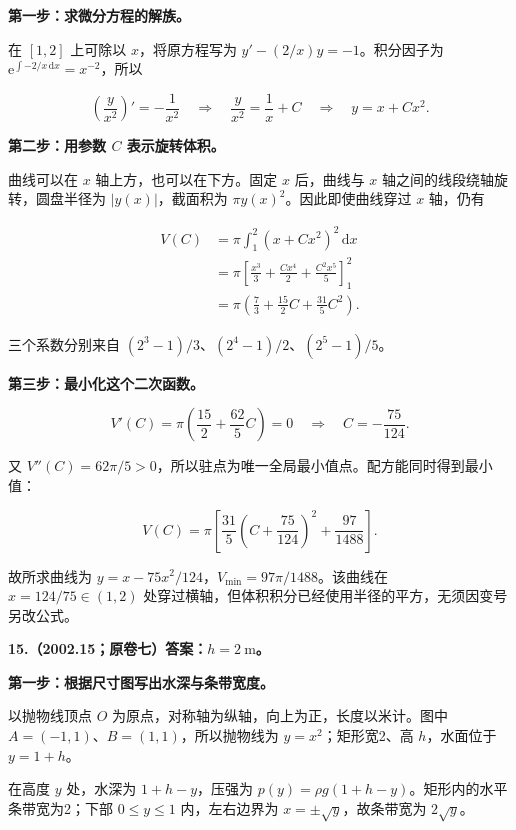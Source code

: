 \documentclass[UTF8,11pt,fontset=windows]{ctexart}
\begin{document}
\textbf{第一步：求微分方程的解族。}

在 $[1,2]$ 上可除以 $x$，将原方程写为 $y'-(2/x)y=-1$。积分因子为 $\mathrm e^{\int-2/x\,\mathrm dx}=x^{-2}$，所以

$$
\left(\frac y{x^2}\right)'=-\frac1{x^2}
\quad\Longrightarrow\quad
\frac y{x^2}=\frac1x+C
\quad\Longrightarrow\quad y=x+Cx^2.
$$

\textbf{第二步：用参数 $C$ 表示旋转体积。}

曲线可以在 $x$ 轴上方，也可以在下方。固定 $x$ 后，曲线与 $x$ 轴之间的线段绕轴旋转，圆盘半径为 $|y(x)|$，截面积为 $\pi y(x)^2$。因此即使曲线穿过 $x$ 轴，仍有

$$
\begin{aligned}
V(C)&=\pi\int_1^2(x+Cx^2)^2\,\mathrm dx\\
&=\pi\left[\frac{x^3}{3}+\frac{Cx^4}{2}+\frac{C^2x^5}{5}\right]_1^2\\
&=\pi\left(\frac73+\frac{15}{2}C+\frac{31}{5}C^2\right).
\end{aligned}
$$

三个系数分别来自 $(2^3-1)/3$、$(2^4-1)/2$、$(2^5-1)/5$。

\textbf{第三步：最小化这个二次函数。}

$$
V'(C)=\pi\left(\frac{15}{2}+\frac{62}{5}C\right)=0
\quad\Longrightarrow\quad C=-\frac{75}{124}.
$$

又 $V''(C)=62\pi/5>0$，所以驻点为唯一全局最小值点。配方能同时得到最小值：

$$
V(C)=\pi\left[\frac{31}{5}\left(C+\frac{75}{124}\right)^2+\frac{97}{1488}\right].
$$

故所求曲线为 $\boxed{y=x-75x^2/124}$，$\boxed{V_{\min}=97\pi/1488}$。该曲线在 $x=124/75\in(1,2)$ 处穿过横轴，但体积积分已经使用半径的平方，无须因变号另改公式。

\clearpage

\textbf{15.（2002.15；原卷七）答案：$h=2\ \mathrm m$。}

\textbf{第一步：根据尺寸图写出水深与条带宽度。}

以抛物线顶点 $O$ 为原点，对称轴为纵轴，向上为正，长度以米计。图中 $A=(-1,1)$、$B=(1,1)$，所以抛物线为 $y=x^2$；矩形宽2、高 $h$，水面位于 $y=1+h$。

在高度 $y$ 处，水深为 $1+h-y$，压强为 $p(y)=\rho g(1+h-y)$。矩形内的水平条带宽为2；下部 $0\le y\le1$ 内，左右边界为 $x=\pm\sqrt y$，故条带宽为 $2\sqrt y$。
\end{document}
